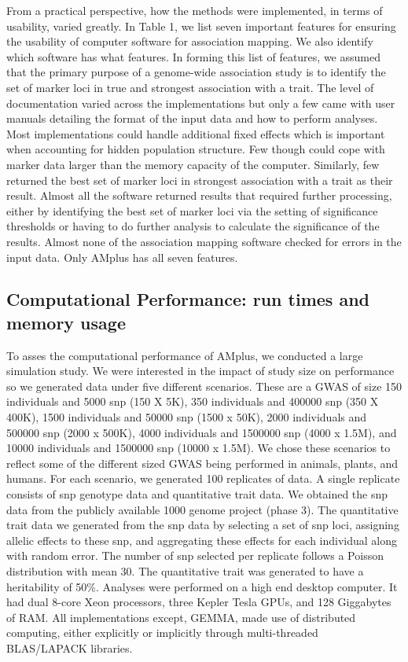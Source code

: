 \documentclass{nature}
\begin{document}
From a practical perspective, how the methods were implemented, in terms of usability, varied greatly. In Table 1, we list seven important features for ensuring the usability of computer software for association mapping. We also identify which software has what features. 
In forming this list of features, we assumed that the primary purpose of a genome-wide association study is 
to identify the set of marker loci in true and strongest association with a trait.  The level of documentation varied across the implementations but only 
a few came with user manuals detailing the format of the input data and how to perform analyses. 
Most implementations could handle additional fixed effects which is important when accounting for hidden population structure. 
Few though could cope with marker data larger than the memory capacity of the computer. Similarly, few returned the best set of marker loci in strongest association with a trait as their result. Almost all the software returned results that required further processing, either 
by identifying the best set of marker loci via the setting of significance thresholds or having to do further analysis to calculate the significance of the results. Almost none of the association mapping software checked for errors in the input data.  Only AMplus has all seven features. 


\subsection{Computational Performance: run times and memory usage}


To asses the computational performance of AMplus, we conducted a large simulation study. 
We were interested in  the impact of study size on  performance so we generated data under five different scenarios. 
These are a GWAS of size 150 individuals and 5000 snp (150 X 5K), 350 individuals and 400000 snp (350 X 400K),  1500 individuals and 
50000 snp (1500 x 50K), 2000 individuals and 500000 snp (2000 x 500K), 4000 individuals and 
1500000 snp (4000 x 1.5M), and 10000 individuals and 1500000 snp (10000 x 1.5M).  
We chose these scenarios to reflect some of the different sized GWAS being performed in animals, plants, and humans. 
For each scenario, we generated 100 replicates of data. A single replicate consists of snp genotype data and quantitative trait data. 
We obtained the snp data from the publicly available 1000 genome project (phase 3). The quantitative trait data we generated from the 
snp data by selecting a set of snp loci, assigning allelic effects to these snp, and aggregating these effects for each individual along with 
random error. The number of snp selected per replicate follows a Poisson distribution with mean 30.
 The quantitative trait was generated to have a heritability of 50\%.
Analyses were performed on a high end desktop computer. It had dual 8-core Xeon processors, three Kepler Tesla GPUs, and 128 Giggabytes of RAM. All implementations except, GEMMA, made use of distributed computing, either explicitly or implicitly through multi-threaded BLAS/LAPACK libraries. 
\end{document}
